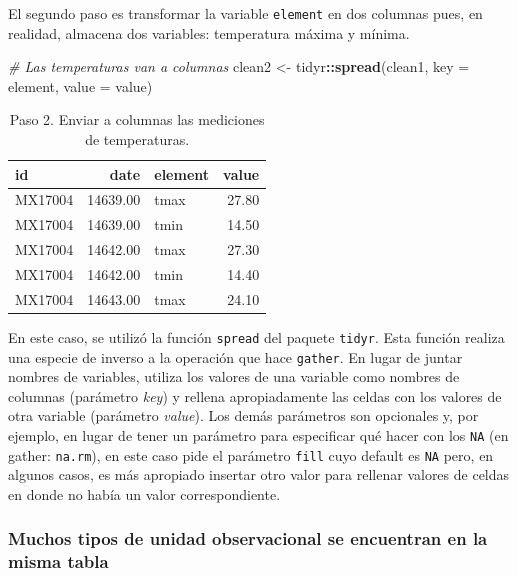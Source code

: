 \documentclass[]{article}
\newenvironment{Shaded}{\begin{snugshade}}{\end{snugshade}}
\newcommand{\KeywordTok}[1]{\textcolor[rgb]{0.13,0.29,0.53}{\textbf{#1}}}
\newcommand{\DataTypeTok}[1]{\textcolor[rgb]{0.13,0.29,0.53}{#1}}
\newcommand{\StringTok}[1]{\textcolor[rgb]{0.31,0.60,0.02}{#1}}
\newcommand{\CommentTok}[1]{\textcolor[rgb]{0.56,0.35,0.01}{\textit{#1}}}
\newcommand{\OperatorTok}[1]{\textcolor[rgb]{0.81,0.36,0.00}{\textbf{#1}}}
\newcommand{\NormalTok}[1]{#1}
\begin{document}
El segundo paso es transformar la variable \texttt{element} en dos
columnas pues, en realidad, almacena dos variables: temperatura máxima y
mínima.

\begin{Shaded}
\begin{Highlighting}[]
\CommentTok{# Las temperaturas van a columnas}
\NormalTok{clean2 <-}\StringTok{ }\NormalTok{tidyr}\OperatorTok{::}\KeywordTok{spread}\NormalTok{(clean1, }\DataTypeTok{key =}\NormalTok{ element, }\DataTypeTok{value =}\NormalTok{ value)}
\end{Highlighting}
\end{Shaded}

\begin{table}[ht]
\centering
\begin{tabular}{lrlr}
  \hline
id & date & element & value \\ 
  \hline
MX17004 & 14639.00 & tmax & 27.80 \\ 
  MX17004 & 14639.00 & tmin & 14.50 \\ 
  MX17004 & 14642.00 & tmax & 27.30 \\ 
  MX17004 & 14642.00 & tmin & 14.40 \\ 
  MX17004 & 14643.00 & tmax & 24.10 \\ 
   \hline
\end{tabular}
\caption{Paso 2. Enviar a columnas las mediciones de temperaturas.} 
\label{tab:clima1}
\end{table}

En este caso, se utilizó la función \texttt{spread} del paquete
\texttt{tidyr}. Esta función realiza una especie de inverso a la
operación que hace \texttt{gather}. En lugar de juntar nombres de
variables, utiliza los valores de una variable como nombres de columnas
(parámetro \emph{key}) y rellena apropiadamente las celdas con los
valores de otra variable (parámetro \emph{value}). Los demás parámetros
son opcionales y, por ejemplo, en lugar de tener un parámetro para
especificar qué hacer con los \texttt{NA} (en gather: \texttt{na.rm}),
en este caso pide el parámetro \texttt{fill} cuyo default es \texttt{NA}
pero, en algunos casos, es más apropiado insertar otro valor para
rellenar valores de celdas en donde no había un valor correspondiente.

\subsubsection{Muchos tipos de unidad observacional se encuentran en la
misma
tabla}\label{muchos-tipos-de-unidad-observacional-se-encuentran-en-la-misma-tabla}
\end{document}
